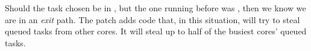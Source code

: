 Should the task chosen be in \schedidle{}, but the one running before was
\schednormal{}, then we know we are in an \textit{exit} path. The patch adds
code that, in this situation, will try to steal queued \schednormal{} tasks from
other cores. It will steal up to half of the busiest cores' queued
\schednormal{} tasks.

